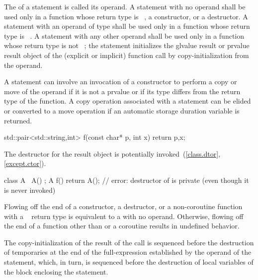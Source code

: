 \pnum
The 
of a  statement is called its operand. A  statement with
no operand shall be used only in a function whose return type is
\cv{}~, a constructor, or a
destructor.
%
%
A  statement with an operand of type  shall be used only
in a function whose return type is \cv{}~.
A  statement with any other operand shall be used only
in a function whose return type is not \cv{}~;
%
the  statement initializes the
glvalue result or prvalue result object of the (explicit or implicit) function call
by copy-initialization from the operand.
\begin{note}
A  statement can involve
an invocation of a constructor to perform a copy or move of the operand
if it is not a prvalue or if its type differs from the return type of the function.
A copy operation associated with a  statement can be elided or
converted to a move operation if an automatic storage duration variable is returned.
\end{note}
\begin{example}
\begin{codeblock}
std::pair<std::string,int> f(const char* p, int x) {
  return {p,x};
}
\end{codeblock}
\end{example}
The destructor for the result object
is potentially invoked~(\ref{class.dtor}, \ref{except.ctor}).
\begin{example}
\begin{codeblock}
class A {
  ~A() {}
};
A f() { return A(); }   // error: destructor of  is private (even though it is never invoked)
\end{codeblock}
\end{example}
Flowing off the end of
a constructor,
a destructor, or
a non-coroutine function with a \cv{}~ return type is
equivalent to a  with no operand.
Otherwise, flowing off the end of a function
other than  or a coroutine
results in undefined behavior.

\pnum
The copy-initialization of the result of the call is sequenced before the
destruction of temporaries at the end of the full-expression established
by the operand of the  statement, which, in turn, is sequenced
before the destruction of local variables of the block
enclosing the  statement.

